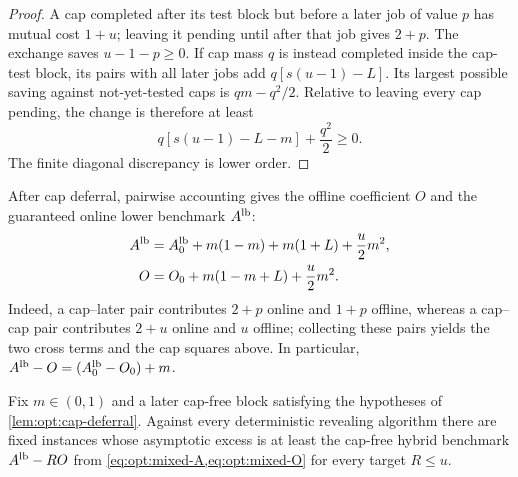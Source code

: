 \begin{proof}
A cap completed after its test block but before a later job of value $p$
has mutual cost $1+u$; leaving it pending until after that job gives $2+p$.
The exchange saves $u-1-p\ge0$.  If cap mass $q$ is instead completed inside
the cap-test block, its pairs with all later jobs add
$q[s(u-1)-L]$.  Its largest possible saving against not-yet-tested caps is
$qm-q^2/2$.  Relative to leaving every cap pending, the change is therefore
at least
\begin{equation}
 q[s(u-1)-L-m]+\frac{q^2}{2}\ge0.
\end{equation}
The finite diagonal discrepancy is lower order.
\end{proof}

After cap deferral, pairwise accounting gives the offline coefficient $O$
and the guaranteed online lower benchmark $A^{\rm lb}$:
\begin{align}
 A^{\rm lb}={}&A_0^{\rm lb}+m(1-m)+m(1+L)+\frac u2m^2,
 \label{eq:opt:mixed-A}\\
 O={}&O_0+m(1-m+L)+\frac u2m^2.
 \label{eq:opt:mixed-O}
\end{align}
Indeed, a cap--later pair contributes $2+p$ online and $1+p$ offline,
whereas a cap--cap pair contributes $2+u$ online and $u$ offline; collecting
these pairs yields the two cross terms and the cap squares above.
In particular, $A^{\rm lb}-O=(A_0^{\rm lb}-O_0)+m$.

\begin{lemma}
\label{lem:opt:mixed-raw-safe}
Fix $m\in(0,1)$ and a later cap-free block satisfying the hypotheses of
\cref{lem:opt:cap-deferral}.  Against every deterministic revealing algorithm
there are fixed instances whose asymptotic excess is at least the cap-free
hybrid benchmark $A^{\rm lb}-RO$ from
\cref{eq:opt:mixed-A,eq:opt:mixed-O} for every target
$R\le u$.
\end{lemma}

